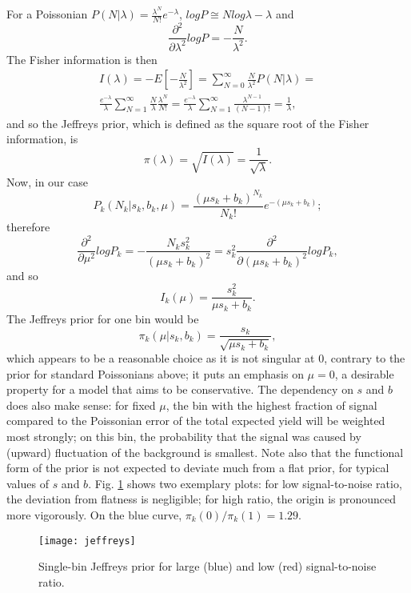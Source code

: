 \documentclass[aps,prb,twocolumn,showpacs,superscriptaddress,groupedaddress]{revtex4}  %
\begin{document}
For a Poissonian $P(N|\lambda)=\frac{\lambda^{N}}{N!}e^{-\lambda}$, $log P\cong N log\lambda - \lambda$ and
\begin{equation}
\frac{\partial^{2}}{\partial\lambda^{2}}log P=-\frac{N}{\lambda^{2}}.
\end{equation}
The Fisher information is then
\begin{equation}
\begin{split}
I(\lambda)=-E[-\frac{N}{\lambda^{2}}]=\sum\limits_{N=0}^{\infty}\frac{N}{\lambda^{2}}P(N|\lambda)=\\
\frac{e^{-\lambda}}{\lambda}\sum\limits_{N=1}^{\infty}\frac{N}{\lambda}\frac{\lambda^{N}}{N!}=\frac{e^{-\lambda}}{\lambda}\sum\limits_{N=1}^{\infty}\frac{\lambda^{N-1}}{(N-1)!}=\frac{1}{\lambda},
\end{split}
\end{equation}
and so the Jeffreys prior, which is defined as the square root of the Fisher information, is
\begin{equation}
\pi(\lambda)=\sqrt{I(\lambda)}=\frac{1}{\sqrt{\lambda}}.
\end{equation}
Now, in our case
\begin{equation}
P_{k}(N_{k}|s_{k},b_{k},\mu)=\frac{(\mu s_{k}+b_{k})^{N_{k}}}{N_{k}!}e^{-(\mu s_{k}+b_{k})};
\end{equation}
therefore
\begin{equation}
\frac{\partial^{2}}{\partial\mu^{2}}log P_{k}=-\frac{N_{k}s_{k}^{2}}{(\mu s_{k}+b_{k})^{2}}=s_{k}^{2}\frac{\partial^{2}}{\partial(\mu s_{k}+b_{k})^{2}}log P_{k},
\end{equation}
and so
\begin{equation}
I_{k}(\mu)=\frac{s_{k}^{2}}{\mu s_{k}+b_{k}}.
\end{equation}
The Jeffreys prior for one bin would be
\begin{equation}
\pi_{k}(\mu|s_{k},b_{k})=\frac{s_{k}}{\sqrt{\mu s_{k}+b_{k}}},
\end{equation}
which appears to be a reasonable choice as it is not singular at 0, contrary to the prior for standard Poissonians above; it puts an emphasis on $\mu=0$, a desirable property for a model that aims to be conservative. The dependency on $s$ and $b$ does also make sense: for fixed $\mu$, the bin with the highest fraction of signal compared to the Poissonian error of the total expected yield will be weighted most strongly; on this bin, the probability that the signal was caused by (upward) fluctuation of the background is smallest. Note also that the functional form of the prior is not expected to deviate much from a flat prior, for typical values of $s$ and $b$. Fig. \ref{fig:jeffreys} shows two exemplary plots: for low signal-to-noise ratio, the deviation from flatness is negligible; for high ratio, the origin is pronounced more vigorously. On the blue curve, $\pi_{k}(0)/\pi_{k}(1)=1.29$.
\begin{figure}[ht]
\texttt{[image: jeffreys]}
\caption{\label{fig:jeffreys} Single-bin Jeffreys prior for large (blue) and low (red) signal-to-noise ratio.}
\end{figure}
\end{document}
